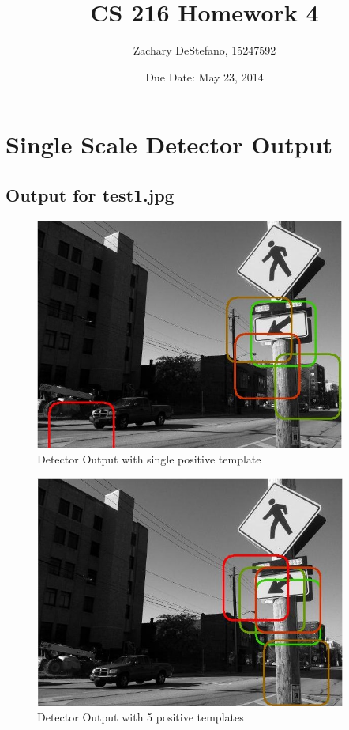 \documentclass[11pt,psfig]{article}
\begin{document}
\setlength{\parskip}{1.2ex plus0.3ex minus 0.3ex}


\thispagestyle{empty} \pagestyle{myheadings} 



\title{CS 216 Homework 4}
\author{Zachary DeStefano, 15247592}
\date{Due Date: May 23, 2014}

\maketitle

\vfill\eject

\newpage

\section*{Single Scale Detector Output}

\subsection*{Output for test1.jpg}

\begin{figure}[H]
\centering
\includegraphics[height=3in]{prob5_a1plot1.jpg}
\caption{Detector Output with single positive template}
\end{figure}

\begin{figure}[H]
\centering
\includegraphics[height=3in]{prob5_a2plot1.jpg}
\caption{Detector Output with 5 positive templates}
\end{figure}
\end{document}
